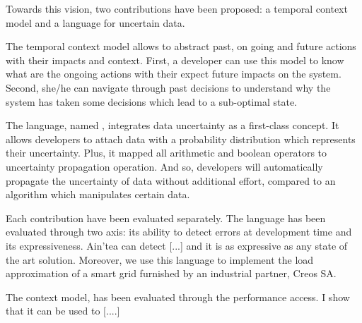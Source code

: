 \bigskip
Towards this vision, two contributions have been proposed: a temporal context model and a language for uncertain data.

The temporal context model allows to abstract past, on going and future actions with their impacts and context.
First, a developer can use this model to know what are the ongoing actions with their expect future impacts on the system.
Second, she/he can navigate through past decisions to understand why the system has taken some decisions which lead to a sub-optimal state.

The language, named \langName, integrates data uncertainty as a first-class concept.
It allows developers to attach data with a probability distribution which represents their uncertainty.
Plus, it mapped all arithmetic and boolean operators to uncertainty propagation operation. 
And so, developers will automatically propagate the uncertainty of data without additional effort, compared to an algorithm which manipulates certain data.

\bigskip
Each contribution have been evaluated separately. 
The language has been evaluated through two axis: its ability to detect errors at development time and its expressiveness.
Ain'tea can detect [...] and it is as expressive as any state of the art solution.
Moreover, we use this language to implement the load approximation of a smart grid furnished by an industrial partner, Creos SA.

The context model, has been evaluated through the performance access.
I show that it can be used to [....]


\bigskip
{}



